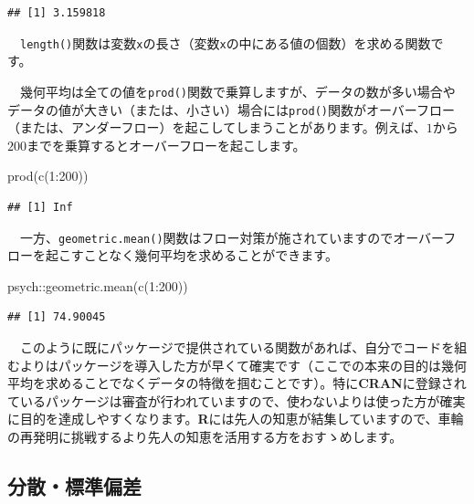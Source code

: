 \documentclass[
  12pt,
]{book}
\newenvironment{Shaded}{\begin{snugshade}}{\end{snugshade}}
\newcommand{\DecValTok}[1]{\textcolor[rgb]{0.00,0.00,0.81}{#1}}
\newcommand{\FunctionTok}[1]{\textcolor[rgb]{0.00,0.00,0.00}{#1}}
\newcommand{\NormalTok}[1]{#1}
\newcommand{\SpecialCharTok}[1]{\textcolor[rgb]{0.00,0.00,0.00}{#1}}
\begin{document}
\begin{verbatim}
## [1] 3.159818
\end{verbatim}

　\texttt{length()}関数は変数\texttt{x}の長さ（変数\texttt{x}の中にある値の個数）を求める関数です。

　幾何平均は全ての値を\texttt{prod()}関数で乗算しますが、データの数が多い場合やデータの値が大きい（または、小さい）場合には\texttt{prod()}関数がオーバーフロー（または、アンダーフロー）を起こしてしまうことがあります。例えば、\(1\)から\(200\)までを乗算するとオーバーフローを起こします。

\begin{Shaded}
\begin{Highlighting}[numbers=left,,]
\FunctionTok{prod}\NormalTok{(}\FunctionTok{c}\NormalTok{(}\DecValTok{1}\SpecialCharTok{:}\DecValTok{200}\NormalTok{))}
\end{Highlighting}
\end{Shaded}

\begin{verbatim}
## [1] Inf
\end{verbatim}

　一方、\texttt{geometric.mean()}関数はフロー対策が施されていますのでオーバーフローを起こすことなく幾何平均を求めることができます。

\begin{Shaded}
\begin{Highlighting}[numbers=left,,]
\NormalTok{psych}\SpecialCharTok{::}\FunctionTok{geometric.mean}\NormalTok{(}\FunctionTok{c}\NormalTok{(}\DecValTok{1}\SpecialCharTok{:}\DecValTok{200}\NormalTok{))}
\end{Highlighting}
\end{Shaded}

\begin{verbatim}
## [1] 74.90045
\end{verbatim}

　このように既にパッケージで提供されている関数があれば、自分でコードを組むよりはパッケージを導入した方が早くて確実です（ここでの本来の目的は幾何平均を求めることでなくデータの特徴を掴むことです）。特に\textbf{CRAN}に登録されているパッケージは審査が行われていますので、使わないよりは使った方が確実に目的を達成しやすくなります。\textbf{R}には先人の知恵が結集していますので、車輪の再発明に挑戦するより先人の知恵を活用する方をおすゝめします。

\newpage

\hypertarget{ux5206ux6563ux6a19ux6e96ux504fux5dee}{%
\subsection{分散・標準偏差}\label{ux5206ux6563ux6a19ux6e96ux504fux5dee}}
\end{document}
